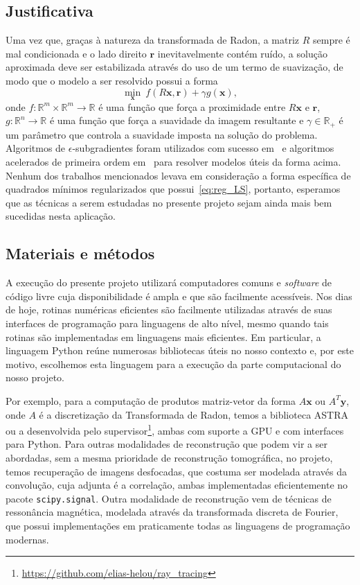 \documentclass[12pt]{article}
\begin{document}
\subsection{Justificativa}

Uma vez que, graças à natureza da transformada de Radon, a matriz $R$ sempre é mal condicionada e o lado direito $\bm r$ inevitavelmente contém ruído, a solução aproximada deve ser estabilizada através do uso de um termo de suavização, de modo que o modelo a ser resolvido possui a forma
\begin{equation*}
  \min_{\bm x}\ f( R\bm x, \bm r ) + \gamma g( \bm x ),
\end{equation*}
onde $f : \mathbb R^m \times \mathbb R^m \to \mathbb R$ é uma função que força a proximidade entre $R\bm x$ e $\bm r$, $g : \mathbb R^n \to \mathbb R$ é uma função que força a suavidade da imagem resultante e $\gamma \in \mathbb R_+$ é um parâmetro que controla a suavidade imposta na solução do problema. Algoritmos de $\epsilon$-subgradientes foram utilizados com sucesso em~\cite{hed09} e algoritmos acelerados de primeira ordem em~\cite{hzh20,hes17} para resolver modelos úteis da forma acima. Nenhum dos trabalhos mencionados levava em consideração a forma específica de quadrados mínimos regularizados que possui~\eqref{eq:reg_LS}, portanto, esperamos que as técnicas a serem estudadas no presente projeto sejam ainda mais bem sucedidas nesta aplicação.

\subsection{Materiais e métodos}

A execução do presente projeto utilizará computadores comuns e \emph{software} de código livre cuja disponibilidade é ampla e que são facilmente acessíveis. Nos dias de hoje, rotinas numéricas eficientes são facilmente utilizadas através de suas interfaces de programação para linguagens de alto nível, mesmo quando tais rotinas são implementadas em linguagens mais eficientes. Em particular, a linguagem Python reúne numerosas bibliotecas úteis no nosso contexto e, por este motivo, escolhemos esta linguagem para a execução da parte computacional do nosso projeto.

Por exemplo, para a computação de produtos matriz-vetor da forma $A\bm x$ ou $A^T\bm y$, onde $A$ é a discretização da Transformada de Radon, temos a biblioteca ASTRA ou a desenvolvida pelo supervisor\footnote{\url{https://github.com/elias-helou/ray_tracing}}, ambas com suporte a GPU e com interfaces para Python. Para outras modalidades de reconstrução que podem vir a ser abordadas, sem a mesma prioridade de reconstrução tomográfica, no projeto, temos recuperação de imagens desfocadas, que costuma ser modelada através da convolução, cuja adjunta é a correlação, ambas implementadas eficientemente no pacote \texttt{scipy.signal}. Outra modalidade de reconstrução vem de técnicas de ressonância magnética, modelada através da transformada discreta de Fourier, que possui implementações em praticamente todas as linguagens de programação modernas.
\end{document}
